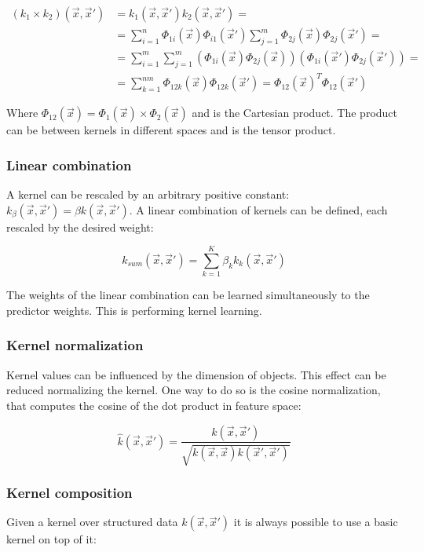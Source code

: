 		\begin{align*}
		(k_1\times k_2)(\vec{x},\vec{x}') &= k_1(\vec{x},\vec{x}')k_2(\vec{x},\vec{x}')=\\
																			&=\sum\limits_{i=1}^n\Phi_{1i}(\vec{x})\Phi_{i1}(\vec{x}')\sum\limits_{j=1}^m\Phi_{2j}(\vec{x})\Phi_{2j}(\vec{x}')=\\
																			&=\sum\limits_{i=1}^m\sum\limits_{j=1}^m(\Phi_{1i}(\vec{x})\Phi_{2j}(\vec{x}))(\Phi_{1i}(\vec{x}')\Phi_{2j}(\vec{x}'))=\\
																			&=\sum\limits_{k=1}^{nm}\Phi_{12k}(\vec{x})\Phi_{12k}(\vec{x}') = \Phi_{12}(\vec{x})^T\Phi_{12}(\vec{x}')
		\end{align*}

		Where $\Phi_{12}(\vec{x}) = \Phi_1(\vec{x})\times\Phi_2(\vec{x})$ and is the Cartesian product.
		The product can be between kernels in different spaces and is the tensor product.

		\subsubsection{Linear combination}
		A kernel can be rescaled by an arbitrary positive constant: $k_\beta(\vec{x},\vec{x}') = \beta k(\vec{x},\vec{x}')$.
		A linear combination of kernels can be defined, each rescaled by the desired weight:

		$$k_{sum}(\vec{x},\vec{x}') = \sum\limits_{k=1}^K\beta_k k_k(\vec{x},\vec{x}')$$

		The weights of the linear combination can be learned simultaneously to the predictor weights.
		This is performing kernel learning.

		\subsubsection{Kernel normalization}
		Kernel values can be influenced by the dimension of objects.
		This effect can be reduced normalizing the kernel.
		One way to do so is the cosine normalization, that computes the cosine of the dot product in feature space:

		$$\hat{k}(\vec{x},\vec{x}') = \frac{k(\vec{x},\vec{x}')}{\sqrt{k(\vec{x},\vec{x})k(\vec{x}',\vec{x}')}}$$

		\subsubsection{Kernel composition}
		Given a kernel over structured data $k(\vec{x},\vec{x}')$ it is always possible to use a basic kernel on top of it:


